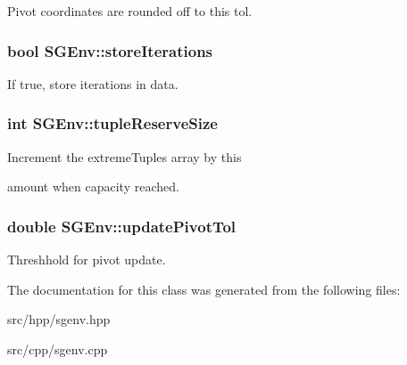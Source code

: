 Pivot coordinates are rounded off to this tol. \hypertarget{classSGEnv_a8ee7f43e894dd5a23865344a547c68bc}{
\subsubsection[{store\-Iterations}]{\setlength{\rightskip}{0pt plus 5cm}bool S\-G\-Env\-::store\-Iterations\hspace{0.3cm}{\ttfamily [private]}}}\label{classSGEnv_a8ee7f43e894dd5a23865344a547c68bc}
If true, store iterations in data. \hypertarget{classSGEnv_ab98e2a00eb89a84a6167875b83b1cbc3}{
\subsubsection[{tuple\-Reserve\-Size}]{\setlength{\rightskip}{0pt plus 5cm}int S\-G\-Env\-::tuple\-Reserve\-Size\hspace{0.3cm}{\ttfamily [private]}}}\label{classSGEnv_ab98e2a00eb89a84a6167875b83b1cbc3}
\begin{DoxyVerb}           Increment the extremeTuples array by this
\end{DoxyVerb}
 amount when capacity reached. \hypertarget{classSGEnv_a621566e738d47ab9929ffa704b05aa63}{
\subsubsection[{update\-Pivot\-Tol}]{\setlength{\rightskip}{0pt plus 5cm}double S\-G\-Env\-::update\-Pivot\-Tol\hspace{0.3cm}{\ttfamily [private]}}}\label{classSGEnv_a621566e738d47ab9929ffa704b05aa63}
Threshhold for pivot update. 

The documentation for this class was generated from the following files\-:\begin{DoxyCompactItemize}
\item 
src/hpp/sgenv.\-hpp\item 
src/cpp/sgenv.\-cpp\end{DoxyCompactItemize}
